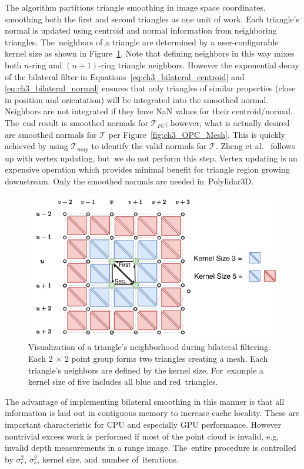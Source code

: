 The algorithm partitions triangle smoothing in image space coordinates, smoothing both the first and second triangles as one unit of work. Each triangle's normal is updated using centroid and normal information from neighboring triangles. The~neighbors of a triangle are determined by a user-configurable kernel size as shown in Figure~\ref{fig:ch3_smooth_bilateral}.  Note that defining neighbors in this way mixes both $n$-ring and $(n+1)$-ring triangle neighbors. However the exponential decay of the bilateral filter in Equations~\ref{eq:ch3_bilateral_centroid} and \ref{eq:ch3_bilateral_normal} ensures that only triangles of similar properties (close in position and orientation) will be integrated into the smoothed normal. Neighbors are not integrated if they have NaN values for their centroid/normal. The~end result is smoothed normals for $\mathcal{T}_{FC}$; however, what is actually desired are smoothed normals for $\mathcal{T}$ per Figure~\ref{fig:ch3_OPC_Mesh}. This is quickly achieved by using $\mathcal{T}_{map}$ to identify the valid normals for $\mathcal{T}$. Zheng et al.~\cite{zheng_bilateral_2011} follows up with vertex updating, but~we do not perform this step. Vertex updating is an expensive operation which provides minimal benefit for triangle region growing downstream. Only the smoothed normals are needed in~Polylidar3D. 


\begin{figure}[H]
    \centering
    \includegraphics[width=.60\linewidth]{chapter_3_polylidar3d/imgs/OPCHalfEdge-BilateralFilter.pdf}
    \caption[Visualization of a triangle's neighborhood during bilateral filtering]{Visualization of a triangle's neighborhood during bilateral filtering.  Each 2 $\times$ 2 point group forms two triangles creating a mesh. Each triangle's neighbors are defined by the kernel size. For~example a kernel size of five includes all blue and red~triangles.}
    \label{fig:ch3_smooth_bilateral}
\end{figure}

The advantage of implementing bilateral smoothing in this manner is that all information is laid out in contiguous memory to increase cache locality. These are important characteristic for CPU and especially \ac{GPU} performance. However nontrivial excess work is performed if most of the point cloud is invalid, e.g, invalid depth measurements in a range image. The~entire procedure is controlled by $\sigma_c^2$, $\sigma_s^2$, kernel size, and~number of~iterations.

